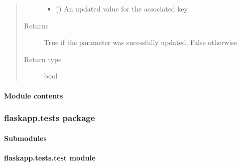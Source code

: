 \documentclass[letterpaper,10pt,english]{sphinxmanual}
\begin{document}
\begin{fulllineitems}
\begin{fulllineitems}
\begin{quote}
\begin{description}
\begin{itemize}
\item {} 
 () \textendash{} An updated value for the associated key

\end{itemize}

\item[{Returns}] \leavevmode
True if the parameter was sucessfully updated, False otherwise

\item[{Return type}] \leavevmode
bool

\end{description}\end{quote}

\end{fulllineitems}


\end{fulllineitems}



\paragraph{Module contents}
\label{\detokenize{flaskapp.data:module-flaskapp.data}}\label{\detokenize{flaskapp.data:module-contents}}

\subsubsection{flaskapp.tests package}
\label{\detokenize{flaskapp.tests:flaskapp-tests-package}}\label{\detokenize{flaskapp.tests::doc}}

\paragraph{Submodules}
\label{\detokenize{flaskapp.tests:submodules}}

\paragraph{flaskapp.tests.test module}
\label{\detokenize{flaskapp.tests:module-flaskapp.tests.test}}\label{\detokenize{flaskapp.tests:flaskapp-tests-test-module}}
\end{document}
